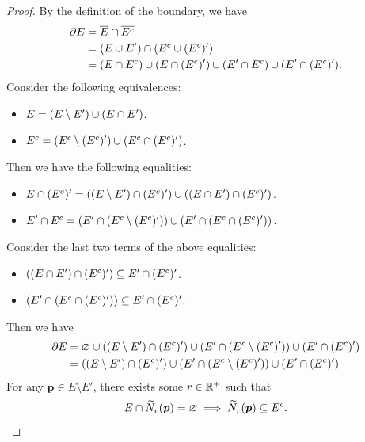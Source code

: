 \begin{proof}
    By the definition of the boundary, we have
    \begin{align*}
        \partial E &= \overline{E} \cap \overline{E^{c}} \\
        &= \paren*{E \cup E'} \cap \paren*{E^{c} \cup (E^{c})'} \\
        &= \paren*{E \cap E^{c}} \cup \paren*{E \cap (E^{c})'}
        \cup \paren*{E' \cap E^{c}} \cup \paren*{E' \cap (E^{c})'}.
    \end{align*}
    Consider the following equivalences:
    \begin{itemize}
        \item $E = \paren*{E \setminus E'} \cup \paren*{E \cap E'}$.
        \item $E^{c} = \paren*{E^{c} \setminus (E^{c})'} \cup \paren*{E^{c} \cap (E^{c})'}$.
    \end{itemize}
    Then we have the following equalities:
    \begin{itemize}
        \item $E \cap (E^{c})' = \paren*{\paren*{E \setminus E'} \cap (E^{c})'}
        \cup \paren*{\paren*{E \cap E'} \cap (E^{c})'}$.
        \item $E' \cap E^{c} = \paren*{E' \cap \paren*{E^{c} \setminus (E^{c})'}}
        \cup \paren*{E' \cap \paren*{E^{c} \cap (E^{c})'}}$.
    \end{itemize}
    Consider the last two terms of the above equalities:
    \begin{itemize}
        \item $\paren*{\paren*{E \cap E'} \cap (E^{c})'} \subseteq E' \cap (E^{c})'$.
        \item $\paren*{E' \cap \paren*{E^{c} \cap (E^{c})'}} \subseteq E' \cap (E^{c})'$.
    \end{itemize}
    Then we have
    \begin{align*}
        \partial E &= \vnot \cup \paren*{\paren*{E \setminus E'} \cap (E^{c})'}
        \cup \paren*{E' \cap \paren*{E^{c} \setminus (E^{c})'}} \cup \paren*{E' \cap (E^{c})'} \\
        &= \paren*{\paren*{E \setminus E'} \cap (E^{c})'}
        \cup \paren*{E' \cap \paren*{E^{c} \setminus (E^{c})'}} \cup \paren*{E' \cap (E^{c})'}
    \end{align*}
    For any $\bm{p} \in E \setminus E'$, there exists some $r \in \R^{+}$ such that
    \[
    E \cap \widetilde{N}_{r}(\bm{p}) = \vnot \implies \widetilde{N}_{r}(\bm{p}) \subseteq E^{c}.
\]
\end{proof}
